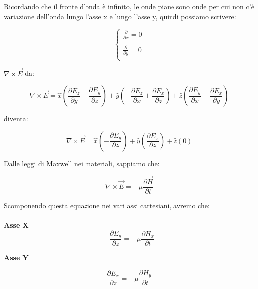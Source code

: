 Ricordando che il fronte d'onda è infinito, 
le onde piane sono onde per cui non c'è variazione dell'onda lungo l'asse x e lungo l'asse y, quindi possiamo scrivere: 

{ \Large \begin{equation}
    \begin{cases}
        \frac{\partial}{\partial x} = 0 \\ \\  
        \frac{\partial}{\partial y} = 0 \\ 
        
    \end{cases}
\end{equation}}

$\nabla \times \vec{E}$ da: 

{
    \Large
    \begin{equation}
        \nabla \times \vec{E} 
        = \hat{x} (\frac{\partial E_z}{\partial y} - \frac{\partial E_y}{\partial z})
        + \hat{y} (-\frac{\partial E_z}{\partial x} + \frac{\partial E_x}{\partial z})
        + \hat{z} (\frac{\partial E_y}{\partial x} - \frac{\partial E_x}{\partial y}) 
    \end{equation}
}

diventa: 

{
    \Large 
    \begin{equation}
        \nabla \times \vec{E} = \hat{x} (- \frac{\partial E_y}{\partial z})
+ \hat{y} (\frac{\partial E_x}{\partial z})
+ \hat{z} (0)  
    \end{equation}
}

Dalle leggi di Maxwell nei materiali, sappiamo che:  

{
    \Large 
    \begin{equation}
        \nabla \times \vec{E} = - \mu \frac{\partial \vec{H}}{\partial t}   
    \end{equation}
}

Scomponendo questa equazione nei vari assi cartesiani, avremo che: \\ \\ 

\textbf{Asse X} 
{
    \Large
    \begin{equation}
     -\frac{\partial E_y}{\partial z} = -\mu \frac{\partial H_x}{\partial t}   
    \end{equation}
}

\textbf{Asse Y}  

{
    \Large
    \begin{equation}
        \frac{\partial E_x}{\partial z} = -\mu \frac{\partial H_y}{\partial t}  
    \end{equation}
}

